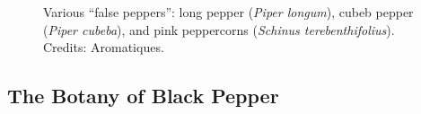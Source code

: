 \begin{figure}[!ht]
	\vspace{-4ex}
	\centering
	\hfill
	\hfill
	\caption[False peppers: long, cubeb, and pink.]{Various ``false peppers'': long pepper (\textit{Piper longum}), cubeb pepper (\textit{Piper cubeba}), and pink peppercorns (\textit{Schinus terebenthifolius}). Credits: Aromatiques.}
	\label{fig:false_peppers_imgs}
\end{figure}




\subsection{The Botany of Black Pepper} 

